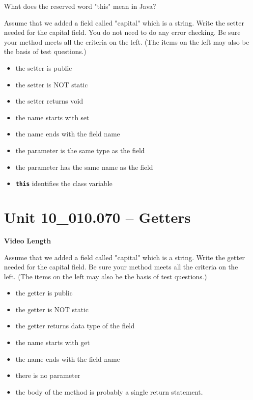 \documentclass[letterpaper,12pt]{exam}
\newcommand{\unit}{Unit 10}
\begin{document}
\begin{questions}
\begin{samepage}
    \question What does the reserved word "this" mean in Java?
    \vspace{5mm}
\end{samepage}

\begin{samepage}
    \question Assume that we added a field called "capital" which is a string.  Write the setter needed for the capital field.  You do not need to do any error checking.  Be sure your method meets all the criteria on the left. (The items on the left may also be the basis of test questions.)
    \begin{itemize}
        \item the setter is public
        \item the setter is NOT static
        \item the setter returns void
        \item the name starts with set
        \item the name ends with the field name
        \item the parameter is the same type as the field
        \item the parameter has the same name as the field
        \item \texttt{\textbf{this}} identifies the class variable
    \end{itemize}
    \vspace{5mm}
\end{samepage}

\section*{\unit\_010.070 -- Getters} 
\par{\selectfont\textbf{Video Length }}
\begin{samepage}
    \question Assume that we added a field called "capital" which is a string.  Write the getter needed for the capital field.  Be sure your method meets all the criteria on the left. (The items on the left may also be the basis of test questions.)
    \begin{itemize}
        \item the getter is public
        \item the getter is NOT static
        \item the getter returns data type of the field
        \item the name starts with get
        \item the name ends with the field name
        \item there is no parameter
        \item the body of the method is probably a single return statement.
    \end{itemize}
    \vspace{5mm}
\end{samepage}


\end{questions}
\end{document}

